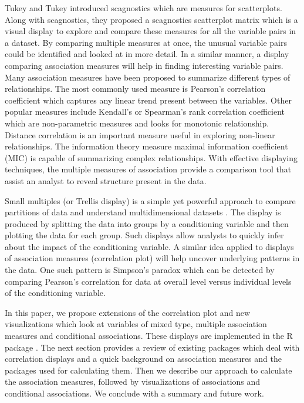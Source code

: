 Tukey and Tukey \citep{tukey1985computer} introduced scagnostics which
are measures for scatterplots. Along with scagnostics, they proposed a
scagnostics scatterplot matrix which is a visual display to explore and
compare these measures for all the variable pairs in a dataset. By
comparing multiple measures at once, the unusual variable pairs could be
identified and looked at in more detail. In a similar manner, a display
comparing association measures will help in finding interesting variable
pairs. Many association measures have been proposed to summarize
different types of relationships. The most commonly used measure is
Pearson's correlation coefficient which captures any linear trend
present between the variables. Other popular measures include Kendall's
or Spearman's rank correlation coefficient which are non-parametric
measures and looks for monotonic relationship. Distance correlation
\citep{szekely2007measuring} is an important measure useful in exploring
non-linear relationships. The information theory measure maximal
information coefficient (MIC) \citep{reshef2011detecting} is capable of
summarizing complex relationships. With effective displaying techniques,
the multiple measures of association provide a comparison tool that
assist an analyst to reveal structure present in the data.

Small multiples (or Trellis display) is a simple yet powerful approach
to compare partitions of data and understand multidimensional datasets
\citep{tufte1986thevisual}. The display is produced by splitting the
data into groups by a conditioning variable and then plotting the data
for each group. Such displays allow analysts to quickly infer about the
impact of the conditioning variable. A similar idea applied to displays
of association measures (correlation plot) will help uncover underlying
patterns in the data. One such pattern is Simpson's paradox which can be
detected by comparing Pearson's correlation for data at overall level
versus individual levels of the conditioning variable.

In this paper, we propose extensions of the correlation plot and new
visualizations which look at variables of mixed type, multiple
association measures and conditional associations. These displays are
implemented in the R package . The next section provides
a review of existing packages which deal with correlation displays and a
quick background on association measures and the packages used for
calculating them. Then we describe our approach to calculate the
association measures, followed by visualizations of associations and
conditional associations. We conclude with a summary and future work.

